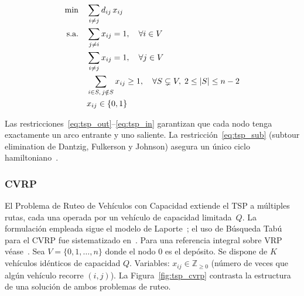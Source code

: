 \begin{align}
  \min        \quad & \sum_{i \neq j} d_{ij}\, x_{ij} \label{eq:tsp_obj}\\
  \text{s.a.} \quad & \sum_{j \neq i} x_{ij} = 1,
                      \quad \forall i \in V \label{eq:tsp_out}\\
                    & \sum_{i \neq j} x_{ij} = 1,
                      \quad \forall j \in V \label{eq:tsp_in}\\
                    & \sum_{i \in S,\, j \notin S} x_{ij} \geq 1,
                      \quad \forall S \subsetneq V,\; 2 \leq |S| \leq n-2
                      \label{eq:tsp_sub}\\
                    & x_{ij} \in \{0,1\} \notag
\end{align}

Las restricciones~\eqref{eq:tsp_out}--\eqref{eq:tsp_in} garantizan que
cada nodo tenga exactamente un arco entrante y uno saliente.
La restricción~\eqref{eq:tsp_sub} (subtour elimination de Dantzig,
Fulkerson y Johnson) asegura un único ciclo hamiltoniano~\cite{applegate2006traveling}.

\subsubsection{CVRP}
El Problema de Ruteo de Vehículos con Capacidad extiende el TSP a múltiples
rutas, cada una operada por un vehículo de capacidad limitada~$Q$.
La formulación empleada sigue el modelo de Laporte~\cite{laporte1992vehicle};
el uso de Búsqueda Tabú para el CVRP fue sistematizado en~\cite{cordeau2002guide}.
Para una referencia integral sobre VRP véase~\cite{toth2002vehicle}.
Sea $V = \{0,1,\ldots,n\}$ donde el nodo $0$ es el depósito.
Se dispone de $K$ vehículos idénticos de capacidad $Q$.
Variables: $x_{ij} \in \mathbb{Z}_{\geq 0}$ (número de veces que
algún vehículo recorre $(i,j)$).
La Figura~\ref{fig:tsp_cvrp} contrasta la estructura de una solución de
ambos problemas de ruteo.

